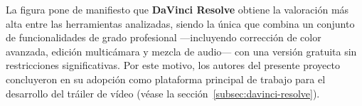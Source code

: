 La figura pone de manifiesto que \textbf{DaVinci Resolve} obtiene la valoración más alta entre las
herramientas analizadas, siendo la única que combina un conjunto de funcionalidades de grado profesional
---incluyendo corrección de color avanzada, edición multicámara y mezcla de audio--- con una versión
gratuita sin restricciones significativas. Por este motivo, los autores del presente proyecto
concluyeron en su adopción como plataforma principal de trabajo para el desarrollo del tráiler de
vídeo (véase la sección~\ref{subsec:davinci-resolve}).